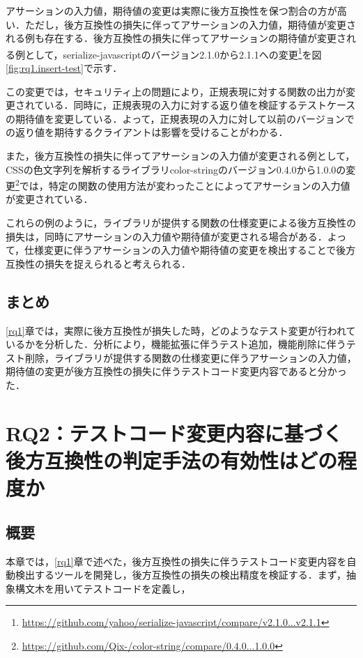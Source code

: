 \documentclass[11pt,dvipdfmx]{jreport}
\begin{document}
アサーションの入力値，期待値の変更は実際に後方互換性を保つ割合の方が高い．ただし，後方互換性の損失に伴ってアサーションの入力値，期待値が変更される例も存在する．後方互換性の損失に伴ってアサーションの期待値が変更される例として，serialize-javascriptのバージョン2.1.0から2.1.1への変更\footnote{\url{https://github.com/yahoo/serialize-javascript/compare/v2.1.0...v2.1.1}}を図\ref{fig:rq1.insert-test}で示す．

この変更では，セキュリティ上の問題により，正規表現に対する関数の出力が変更されている．同時に，正規表現の入力に対する返り値を検証するテストケースの期待値を変更している．よって，正規表現の入力に対して以前のバージョンでの返り値を期待するクライアントは影響を受けることがわかる．

また，後方互換性の損失に伴ってアサーションの入力値が変更される例として，CSSの色文字列を解析するライブラリcolor-stringのバージョン0.4.0から1.0.0の変更\footnote{\url{https://github.com/Qix-/color-string/compare/0.4.0...1.0.0}}では，特定の関数の使用方法が変わったことによってアサーションの入力値が変更されている．

これらの例のように，ライブラリが提供する関数の仕様変更による後方互換性の損失は，同時にアサーションの入力値や期待値が変更される場合がある．よって，仕様変更に伴うアサーションの入力値や期待値の変更を検出することで後方互換性の損失を捉えられると考えられる．

\section{まとめ}
\ref{rq1}章では，実際に後方互換性が損失した時，どのようなテスト変更が行われているかを分析した．分析により，機能拡張に伴うテスト追加，機能削除に伴うテスト削除，ライブラリが提供する関数の仕様変更に伴うアサーションの入力値，期待値の変更が後方互換性の損失に伴うテストコード変更内容であると分かった．

\chapter{RQ2：テストコード変更内容に基づく後方互換性の判定手法の有効性はどの程度か}

\section{概要}
本章では，\ref{rq1}章で述べた，後方互換性の損失に伴うテストコード変更内容を自動検出するツールを開発し，後方互換性の損失の検出精度を検証する．まず，抽象構文木を用いてテストコードを定義し，
\end{document}
